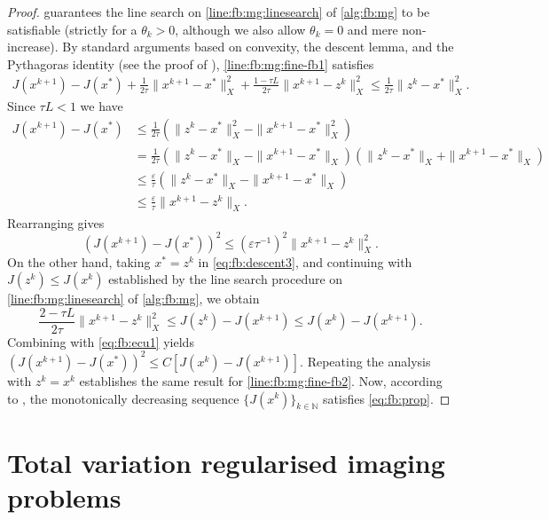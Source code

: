 \documentclass[a4paper,english]{jnsao}
\theoremstyle{definition}
\numberwithin{algorithm}{section}
\newcommand{\cj}[1]{\{ #1\}}
\newcommand{\df}[2]{#1 ( #2 )}
\newcommand{\nr}[2]{ \| #1 \|_{#2}}
\begin{document}
\begin{proof}
     guarantees the line search on \cref{line:fb:mg:linesearch} of \cref{alg:fb:mg} to be satisfiable (strictly for a $\theta_k>0$, although we also allow $\theta_k=0$ and mere non-increase).
    By standard arguments based on convexity, the descent lemma, and the Pythagoras identity (see the proof of \cite[Theorem 11.4]{clason2020introduction}), \cref{line:fb:mg:fine-fb1} satisfies
    \begin{align}
        \label{eq:fb:descent3}
        J(x^{k+1}) -J(x^*) +\frac{1}{2\tau} \nr{x^{k+1}-x^*}{X}^2 + \frac{1-\tau L}{2\tau}\nr{x^{k+1}-z^k}{X}^2\leq \frac{1}{2\tau} \nr{z^k-x^*}{X}^2.
    \end{align}
    Since $\tau L<1$ we have
    \[
        \begin{split}
            J(x^{k+1}) -J(x^*)
            &
            \leq \frac{1}{2\tau} \df{}{\nr{z^k-x^*}{X}^2-\nr{x^{k+1}-x^*}{X}^2}
            \\
            &
            = \frac{1}{2\tau} \df{}{\nr{z^k-x^*}{X}-\nr{x^{k+1}-x^*}{X}}\df{}{\nr{z^k-x^*}{X}+\nr{x^{k+1}-x^*}{X}}
            \\
            &
            \leq \frac{\varepsilon}{\tau} \df{}{\nr{z^k-x^*}{X}-\nr{x^{k+1}-x^*}{X}}
            \\
            &
            \leq \frac{\varepsilon}{\tau} \nr{x^{k+1}-z^k}{X}.
        \end{split}
    \]
    Rearranging gives
    \begin{equation}
        \label{eq:fb:ecu1}
        \df{}{J(x^{k+1})-J(x^*)}^2 \leq (\varepsilon \tau ^{-1})^2 \nr{x^{k+1}-z^k}{X}^2.
    \end{equation}
    On the other hand, taking $x^*=z^k$ in \eqref{eq:fb:descent3}, and continuing with $J(z^k) \le J(x^k)$ established by the line search procedure on \cref{line:fb:mg:linesearch} of \cref{alg:fb:mg}, we obtain
    \[
        \frac{2-\tau L}{2\tau}\nr{x^{k+1}-z^k}{X}^2
        \le
        J(z^k) - J(x^{k+1})
        \le
        J(x^k) - J(x^{k+1}).
    \]
    Combining with \cref{eq:fb:ecu1} yields
    $
        (J(x^{k+1})-J(x^*))^2\leq C[J(x^k) - J(x^{k+1})].
    $
    Repeating the analysis with $z^k=x^k$ establishes the same result for \cref{line:fb:mg:fine-fb2}.
    Now, according to \cite[Lemma 4]{karimi2017imro}, the monotonically decreasing sequence $\cj{J(x^k)}_{k\in \mathbb{N}}$ satisfies \cref{eq:fb:prop}.
\end{proof}

\section{Total variation regularised imaging problems}
\label{sec:tv}
\end{document}
